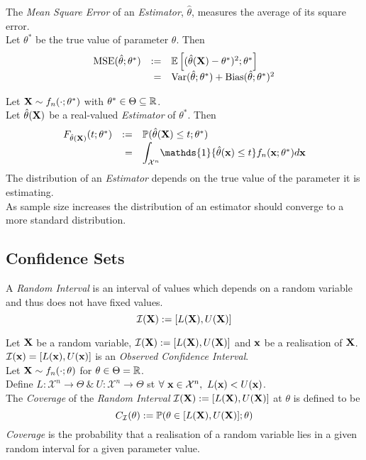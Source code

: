 \documentclass[11pt,a4paper]{article}
\begin{document}
The \textit{Mean Square Error} of an \textit{Estimator}, $\hat\theta$, measures the average of its square error.\\
Let $\theta^*$ be the true value of parameter $\theta$. Then
\[\begin{array}{rrl}
\text{MSE}(\hat\theta;\theta^*)&:=&\mathbb{E}\left[(\hat\theta(\textbf{X})-\theta^*)^2;\theta^*\right]\\
&=&\mathrm{Var}(\hat\theta;\theta^*)+\text{Bias}(\hat\theta;\theta^*)^2
\end{array}\]

Let $\textbf{X}\sim f_n(\cdot;\theta^*)$ with $\theta^*\in\Theta\subseteq\mathbb{R}$.\\
Let $\hat\theta(\textbf{X})$ be a real-valued \textit{Estimator} of $\theta^*$. Then
\[\begin{array}{rrl}
F_{\hat\theta(\X)}(t;\theta^*)&:=&\prob(\hat\theta(\X)\leq t;\theta^*)\\
&=&{\displaystyle\int_{\mathcal{X}^n}}\mathds{1}\{\hat\theta(\x)\leq t\}f_n(\x;\theta^*)d\x
\end{array}\]
\nb The distribution of an \textit{Estimator} depends on the true value of the parameter it is estimating.\\
\nb As sample size increases the distribution of an estimator should converge to a more standard distribution.

\subsection{Confidence Sets}

A \textit{Random Interval} is an interval of values which depends on a random variable and thus does not have fixed values.
$$\mathcal{I}(\textbf{X}):=[L(\textbf{X}),U(\textbf{X})]$$

Let $\textbf{X}$ be a random variable, $\mathcal{I}(\textbf{X}):=[L(\textbf{X}),U(\textbf{X})]$ and $\textbf{x}$ be a realisation of $\textbf{X}$.\\
$\mathcal{I}(\textbf{x})=[L(\textbf{x}),U(\textbf{x})]$ is an \textit{Observed Confidence Interval}.\\

Let $\textbf{X}\sim f_n(\cdot;\theta)$ for $\theta\in\Theta=\mathbb{R}$.\\
Define $L:\mathcal{X}^n\to\Theta\ \&\ U:\mathcal{X}^n\to\Theta$ st $\forall\ \x\in\mathcal{X}^n,\ L(\x)<U(\x)$.\\
The \textit{Coverage} of the \textit{Random Interval} $\mathcal{I}(\textbf{X}):=[L(\textbf{X}),U(\textbf{X})]$ at $\theta$ is defined to be
$$C_\mathcal{I}(\theta):=\mathbb{P}(\theta\in[L(\textbf{X}),U(\textbf{X})];\theta)$$
\nb \textit{Coverage} is the probability that a realisation of a random variable lies in a given random interval for a given parameter value.\\
\end{document}
